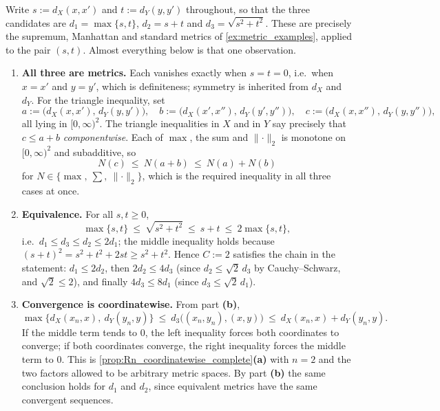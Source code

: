 \begin{exercisesolution}
\label{sol:product_metric_spaces}
Write $s := d_X(x,x')$ and $t := d_Y(y,y')$ throughout, so that the three candidates are
$d_1 = \max\{s,t\}$, $d_2 = s+t$ and $d_3 = \sqrt{s^2+t^2}$. These are precisely the supremum,
Manhattan and standard metrics of \cref{ex:metric_examples}, applied to the pair $(s,t)$. Almost
everything below is that one observation.
\begin{enumerate}[label=\textbf{(\alph*)}]
  \item \textbf{All three are metrics.} Each vanishes exactly when $s = t = 0$, i.e.\ when
    $x=x'$ and $y=y'$, which is definiteness; symmetry is inherited from $d_X$ and $d_Y$. For
    the triangle inequality, set
    \[a := \big(d_X(x,x'),\,d_Y(y,y')\big), \quad
      b := \big(d_X(x',x''),\,d_Y(y',y'')\big), \quad
      c := \big(d_X(x,x''),\,d_Y(y,y'')\big),\]
    all lying in $[0,\infty)^2$. The triangle inequalities in $X$ and in $Y$ say precisely that
    $c \leq a+b$ \emph{componentwise}. Each of $\max$, the sum and $\lVert\cdot\rVert_2$ is
    monotone on $[0,\infty)^2$ and subadditive, so
    \[N(c) \ \leq\ N(a+b) \ \leq\ N(a) + N(b)\]
    for $N \in \{\max,\ \textstyle\sum,\ \lVert\cdot\rVert_2\}$, which is the required inequality
    in all three cases at once.
  \item \textbf{Equivalence.} For all $s,t \geq 0$,
    \[\max\{s,t\} \ \leq\ \sqrt{s^2+t^2} \ \leq\ s+t \ \leq\ 2\max\{s,t\},\]
    i.e.\ $d_1 \leq d_3 \leq d_2 \leq 2d_1$; the middle inequality holds because
    $(s+t)^2 = s^2+t^2+2st \geq s^2+t^2$. Hence $C := 2$ satisfies the chain in the statement:
    $d_1 \leq 2d_2$, then $2d_2 \leq 4d_3$ (since $d_2 \leq \sqrt2\,d_3$ by Cauchy--Schwarz,
    and $\sqrt2 \leq 2$), and finally $4d_3 \leq 8d_1$ (since $d_3 \leq \sqrt2\,d_1$).
  \item \textbf{Convergence is coordinatewise.} From part \textbf{(b)},
    \[\max\big\{d_X(x_n,x),\ d_Y(y_n,y)\big\}
      \ \leq\ d_3\big((x_n,y_n),(x,y)\big)
      \ \leq\ d_X(x_n,x) + d_Y(y_n,y).\]
    If the middle term tends to $0$, the left inequality forces both coordinates to converge; if
    both coordinates converge, the right inequality forces the middle term to $0$. This is
    \cref{prop:Rn_coordinatewise_complete}\textbf{(a)} with $n = 2$ and the two factors allowed
    to be arbitrary metric spaces. By part \textbf{(b)} the same conclusion holds for $d_1$ and
    $d_2$, since equivalent metrics have the same convergent sequences.
\end{enumerate}
\end{exercisesolution}

